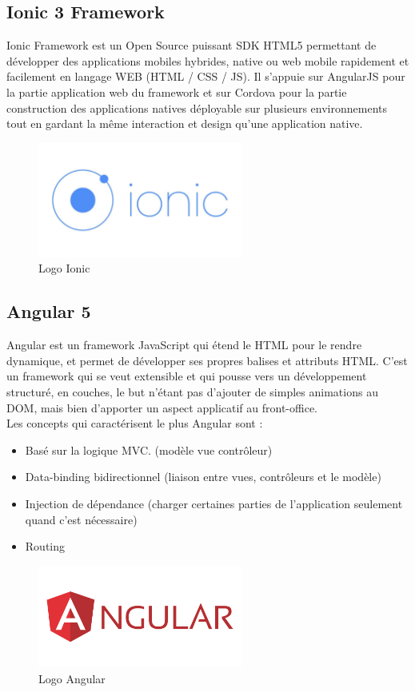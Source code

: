 \documentclass[11pt,a4paper,oneside]{book}
\begin{document}
					\subsection{Ionic 3 Framework}
					Ionic Framework est  un Open Source puissant SDK HTML5 permettant de développer des applications mobiles hybrides, native ou web mobile rapidement et facilement en langage WEB (HTML / CSS / JS). Il s’appuie sur AngularJS pour la partie application web du framework et sur Cordova  pour la partie construction des applications natives déployable sur plusieurs environnements tout en gardant la même interaction et design qu'une application native.
					\begin{figure}[H]
						\centering
						\includegraphics[width=0.6\textwidth]{Images/ch4/ionic}
						\caption{Logo Ionic}
						\label{fig:ionic}
					\end{figure}
					
					\subsection{Angular 5}
					Angular est un framework JavaScript qui étend le HTML pour le rendre dynamique, et permet de développer ses propres balises et attributs HTML. C’est un framework qui se veut extensible et qui pousse vers un développement structuré, en couches, le but n’étant pas d’ajouter de simples animations au DOM, mais bien d’apporter un aspect applicatif au front-office.\\
					Les concepts qui caractérisent le plus Angular sont :
					\begin{itemize}
						\item Basé sur la logique MVC. (modèle vue contrôleur)
						\item Data-binding bidirectionnel (liaison entre vues,  contrôleurs et le modèle)
						\item Injection de dépendance (charger certaines parties de l’application seulement quand c’est nécessaire)
						\item Routing
					\end{itemize}
					\begin{figure}[H]
						\centering
						\includegraphics[width=0.6\textwidth]{Images/ch4/angular}
						\caption{Logo Angular}
						\label{fig:angularjs}
					\end{figure}
					
\end{document}
